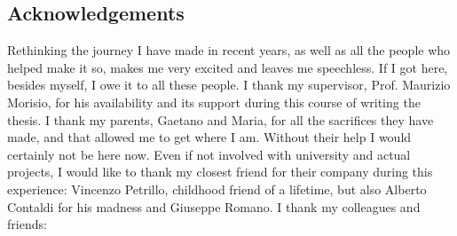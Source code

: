 \newpage
\begin{spacing}{\myspacing}
\section*{Acknowledgements}

Rethinking the journey I have made in recent years, as well as all the people who helped make it so, makes me very excited and leaves me speechless. If I got here, besides myself, I owe it to all these people.
\newline\newline \noindent I thank my supervisor, Prof. Maurizio Morisio, for his availability and its support during this course of writing the thesis.
\newline\newline \noindent I thank my parents, Gaetano and Maria, for all the sacrifices they have made, and that allowed me to get where I am. Without their help I would certainly not be here now.
\newline\newline \noindent Even if not involved with university and actual projects, I would like to thank my closest friend for their company during this experience: Vincenzo Petrillo, childhood friend of a lifetime, but also Alberto Contaldi for his madness and Giuseppe Romano.
\newline\newline \noindent I thank my colleagues and friends: 


\end{spacing}
